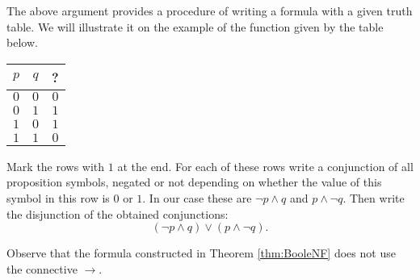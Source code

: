 The above argument provides a procedure of writing a formula with a given truth table.
We will illustrate it on the example of the function given by the table below.

\begin{center}
\begin{tabular}{|c|c|c|}
\hline
$p$ & $q$ & ?\\\hline
$0$ & $0$ & $0$\\\hline
$0$ & $1$ & $1$\\\hline
$1$ & $0$ & $1$\\\hline
$1$ & $1$ & $0$\\\hline
\end{tabular}
\end{center}

Mark the rows with $1$ at the end.
For each of these rows write a conjunction of all proposition symbols, negated or not depending on whether the value of this symbol in this row is $0$ or $1$.
In our case these are $\neg p \wedge q$ and $p \wedge \neg q$.
Then write the disjunction of the obtained conjunctions:
\[
(\neg p \wedge q) \vee (p \wedge \neg q).
\]

Observe that the formula constructed in Theorem \ref{thm:BooleNF} does not use the connective $\to$.